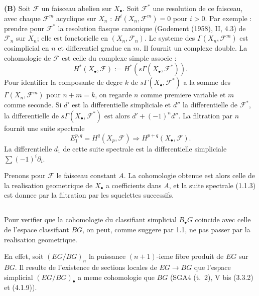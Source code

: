 \documentclass[11pt,a4paper]{article}
\theoremstyle{plain}
\theoremstyle{definition}
\begin{document}
\textbf{(B)} Soit $\mathscr{F}$ un faisceau abelien sur $X_\bullet$. Soit $\mathscr{F}^*$ une resolution de ce faisceau, avec chaque $\mathscr{F}^m$ acyclique sur $X_n$ : $H^i(X_n, \mathscr{F}^m) = 0$ pour $i > 0$. Par exemple : prendre pour $\mathscr{F}^*$ la resolution flasque canonique (Godement (1958), II, 4.3) de $\mathscr{F}_n$ sur $X_n$; elle est fonctorielle en $(X_n, \mathscr{F}_n)$. Le systeme des $\Gamma(X_n, \mathscr{F}^m)$ est cosimplicial en $n$ et differentiel gradue en $m$. Il fournit un complexe double. La cohomologie de $\mathscr{F}$ est celle du complexe simple associe :
\begin{equation}\label{1.1.2}
H^*(X_\bullet, \mathscr{F}) := H^*(s\Gamma(X_\bullet, \mathscr{F}^*)).
\end{equation}
Pour identifier la composante de degre $k$ de $s\Gamma(X_\bullet, \mathscr{F}^*)$ a la somme des $\Gamma(X_n, \mathscr{F}^m)$ pour $n + m = k$, on regarde $n$ comme premiere variable et $m$ comme seconde. Si $d'$ est la differentielle simpliciale et $d''$ la differentielle de $\mathscr{F}^*$, la differentielle de $s\Gamma(X_\bullet, \mathscr{F}^*)$ est alors $d' + (-1)^n d''$. La filtration par $n$ fournit une suite spectrale
\begin{equation}\label{1.1.3}
E_1^{p,q} = H^q(X_p, \mathscr{F}) \Rightarrow H^{p+q}(X_\bullet, \mathscr{F}).
\end{equation}
La differentielle $d_1$ de cette suite spectrale est la differentielle simpliciale $\sum (-1)^i \partial_i$.

Prenons pour $\mathscr{F}$ le faisceau constant $A$. La cohomologie obtenue est alors celle de la realisation geometrique de $X_\bullet$ a coefficients dans $A$, et la suite spectrale (1.1.3) est donnee par la filtration par les squelettes successifs.

\subsection{}\label{1.2}

Pour verifier que la cohomologie du classifiant simplicial $B_\bullet G$ coincide avec celle de l'espace classifiant $BG$, on peut, comme suggere par 1.1, ne pas passer par la realisation geometrique.

En effet, soit $(EG/BG)_n$ la puissance $(n+1)$-ieme fibre produit de $EG$ sur $BG$. Il resulte de l'existence de sections locales de $EG \to BG$ que l'espace simplicial $(EG/BG)_\bullet$ a meme cohomologie que $BG$ (SGA4 (t.~2), V bis (3.3.2) et (4.1.9)).
\end{document}
